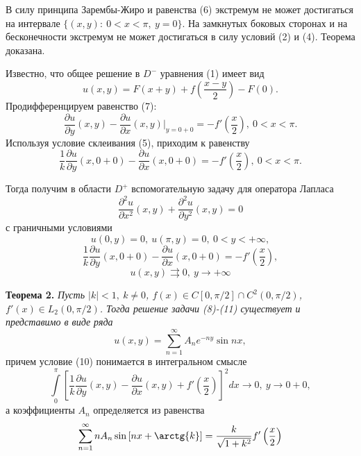 \documentclass[14pt]{article}
\begin{document}
	В силу принципа Зарембы-Жиро и равенства (6) экстремум не может достигаться на интервале $\{(x,y):\ 0 < x < \pi, \ y = 0\}$. На замкнутых боковых сторонах и на бесконечности экстремум не может достигаться в силу условий (2) и (4). Теорема доказана.
	
	Известно, что общее решение в $D^{-}$  уравнения (1) имеет вид 
	\begin{equation}
		u(x,y) = F(x+y) + f(\dfrac{x-y}{2}) - F(0).
	\end{equation}
	Продифференцируем равенство (7):
	\begin{equation*}
		\dfrac{\partial u}{\partial y}(x,y) - \dfrac{\partial u}{\partial x}(x,y) \vert_{y=0+0} = -f'\left(\dfrac{x}2\right), \ 0 < x < \pi.
	\end{equation*}
	Используя условие склеивания (5), приходим к равенству
	\begin{equation*}
		\dfrac{1}{k} \dfrac{\partial u}{\partial y}(x, 0+0) - \dfrac{\partial u}{\partial x}(x, 0 + 0) = - f'\left(\dfrac{x}2\right), \ 0 < x < \pi. 
	\end{equation*}
	
	Тогда получим в области $D^{+}$ вспомогательную задачу для оператора Лапласа 
	\begin{equation}
		\dfrac{\partial^2 u}{\partial x^2}(x,y) + \dfrac{\partial^2 u}{\partial y^2}(x,y) = 0
	\end{equation}
	с граничными условиями 
	\begin{equation}
		u(0,y) = 0, \ u(\pi, y) = 0, \ 0 < y < +\infty, 
	\end{equation}
	\begin{equation}
		\dfrac{1}{k} \dfrac{\partial u}{\partial y}(x,0+0) - \dfrac{\partial u}{\partial x}(x,0+0) = -f'\left(\dfrac{x}{2}\right),
	\end{equation}
	\begin{equation}
		u(x,y) \rightrightarrows 0, \ y \to +\infty 
	\end{equation}
	\par
	\textbf{Теорема 2.} \textit{Пусть $|k| < 1, \ k \neq 0$, $f(x) \in C[0, \pi/2] \cap C^2(0, \pi/2)$, $f'(x) \in L_2(0, \pi/2)$. Тогда решение задачи (8)-(11) существует и представимо в виде ряда
	\begin{equation}
		u(x,y) = \sum\limits_{n=1}^{\infty} A_n e^{-ny} \sin{nx},
		\end{equation}}
	причем условие (10) понимается в интегральном смысле
	\begin{equation*}
		\int\limits_0^\pi \left[	\dfrac{1}{k} \dfrac{\partial u}{\partial y}(x,y) - \dfrac{\partial u}{\partial x}(x,y) + f'\left(\dfrac{x}{2}\right)\right]^2 dx \to 0, \ y \to 0 + 0,
	\end{equation*}
	а коэффициенты $A_n$ определяется из равенства
	\begin{equation}
		\sum\limits_{n=1}^{\infty} n A_n \sin{\left[nx + \arctg{k}\right]} = \dfrac{k}{\sqrt{1 + k^2}} f'\left(\dfrac{x}{2}\right) 
	\end{equation}
	
\end{document}
